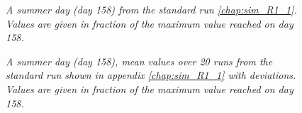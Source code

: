 		\begin{figure}[H]
			\centering
			\caption{\textit{A summer day (day 158) from the standard run \ref{chap:sim_R1_1}. Values are given in fraction of the maximum value reached on day 158.}}
			\label{fig:day158}
		\end{figure}
		
		\begin{figure}[H]
			\centering
			\caption{\textit{A summer day (day 158), mean values over 20 runs from the standard run shown in appendix \ref{chap:sim_R1_1} with deviations. Values are given in fraction of the maximum value reached on day 158.}}
			\label{fig:day158variation}
		\end{figure}
	
